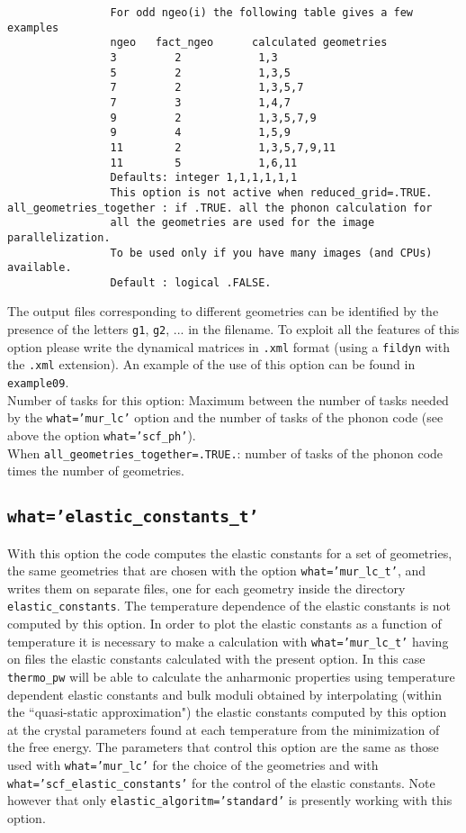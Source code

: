 \documentclass[12pt,a4paper]{article}
\begin{document}
\begin{verbatim}
                For odd ngeo(i) the following table gives a few examples
                ngeo   fact_ngeo      calculated geometries
                3         2            1,3
                5         2            1,3,5
                7         2            1,3,5,7
                7         3            1,4,7
                9         2            1,3,5,7,9
                9         4            1,5,9
                11        2            1,3,5,7,9,11
                11        5            1,6,11
                Defaults: integer 1,1,1,1,1,1
                This option is not active when reduced_grid=.TRUE.
all_geometries_together : if .TRUE. all the phonon calculation for
                all the geometries are used for the image parallelization.
                To be used only if you have many images (and CPUs) available.
                Default : logical .FALSE.
\end{verbatim}
The output files corresponding to different geometries can be identified
by the presence of the letters \texttt{g1}, \texttt{g2}, ... in the filename.
To exploit all the features of this option please write the dynamical matrices
in \texttt{.xml} format (using a \texttt{fildyn} with the \texttt{.xml}
extension).
An example of the use of this option can be found in \texttt{example09}. \\
Number of tasks for this option: Maximum between the number of tasks  
needed by the \texttt{what='mur\_lc'} option and the number
of tasks of the phonon code (see above the option \texttt{what='scf\_ph'}). \\
When \texttt{all\_geometries\_together=.TRUE.}: number of tasks of the
phonon code times the number of geometries. \\

\subsection{\color{web-blue}\texttt{what='elastic\_constants\_t'}}

With this option the code computes the elastic constants for a set of
geometries, the same geometries that are chosen with the option 
\texttt{what='mur\_lc\_t'}, and writes them on separate files, one for
each geometry inside the directory \texttt{elastic\_constants}. The 
temperature dependence of the elastic constants is
not computed by this option. In order to plot the elastic constants
as a function of temperature it is necessary to make a calculation
with \texttt{what='mur\_lc\_t'} having on files the elastic constants
calculated with the present option. In this case \texttt{thermo\_pw}
will be able to calculate the anharmonic properties using temperature
dependent elastic constants and bulk moduli obtained by interpolating 
(within the ``quasi-static approximation") the elastic constants computed 
by this option at the crystal parameters 
found at each temperature from the minimization of the free energy. 
The parameters that control this option are the same as those used with  
\texttt{what='mur\_lc'} for the choice of the geometries and with
\texttt{what='scf\_elastic\_constants'} for the control of the elastic
constants. Note however that only \texttt{elastic\_algoritm='standard'}
is presently working with this option.
\end{document}
